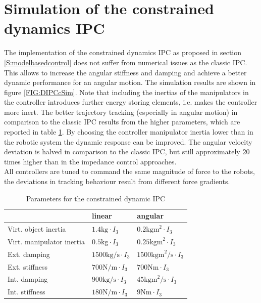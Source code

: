 \documentclass[a4paper,twoside, openright,12pt]{report}
\begin{document}
\section{Simulation of the constrained dynamics IPC}
The implementation of the constrained dynamics IPC as proposed in section \ref{S:modelbasedcontrol} does not suffer from numerical issues as the classic IPC. This allows to increase the angular stiffness and damping and achieve a better dynamic performance for an angular motion. The simulation results are shown in figure \ref{FIG:DIPCcSim}. Note that including the inertias of the manipulators in the controller introduces further energy storing elements, i.e. makes the controller more inert. The better trajectory tracking (especially in angular motion) in comparison to the classic IPC results from the higher parameters, which are reported in table \ref{TAB:DIPCcParameters}. By choosing the controller manipulator inertia lower than in the robotic system the dynamic response can be improved. The angular velocity deviation is halved in comparison to the classic IPC, but still approximately $20$ times higher than in the impedance control approaches.\\
All controllers are tuned to command the same magnitude of force to the robots, the deviations in tracking behaviour result from different force gradients.
\begin{table}
	\centering
	\caption[Parameters for the constrained dynamic IPC]{Parameters for the constrained dynamic IPC}\vspace{10pt}
	\label{TAB:DIPCcParameters}
	
	\begin{tabular}{ l | l | l }
	 & linear & angular \\ \hline
	Virt. object inertia & $1.4 \text{kg} \cdot I_3$ & $0.2 \text{kgm}^2 \cdot I_3$ \\ \hline
	Virt. manipulator inertia & $0.5 \text{kg} \cdot I_3$ & $0.25 \text{kgm}^2 \cdot I_3$ \\ \hline 
	Ext. damping	 & $1500 \text{kg/s} \cdot I_3$ & $1500 \text{kgm}^2 \text{/s} \cdot I_3$ \\ \hline
	Ext. stiffness & $700 \text{N/m} \cdot I_3$ & $700 \text{Nm} \cdot  I_3$ \\ \hline
	Int. damping & $900 \text{kg/s} \cdot I_3$ & $45 \text{kgm}^2 \text{/s} \cdot I_3 $ \\ \hline
	Int. stiffness & $180 \text{N/m} \cdot I_3$ & $9 \text{Nm} \cdot I_3$\\ \hline
\end{tabular}
\end{table}
  
\end{document}
